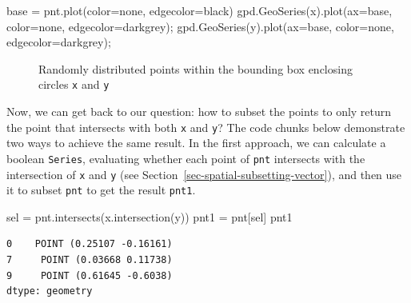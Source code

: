 \documentclass[
  letterpaper,
]{krantz}
\newenvironment{Shaded}{\begin{snugshade}}{\end{snugshade}}
\newcommand{\NormalTok}[1]{\textcolor[rgb]{0.00,0.23,0.31}{#1}}
\newcommand{\OperatorTok}[1]{\textcolor[rgb]{0.37,0.37,0.37}{#1}}
\newcommand{\StringTok}[1]{\textcolor[rgb]{0.13,0.47,0.30}{#1}}
\begin{document}
\begin{Shaded}
\begin{Highlighting}[]
\NormalTok{base }\OperatorTok{=}\NormalTok{ pnt.plot(color}\OperatorTok{=}\StringTok{\textquotesingle{}none\textquotesingle{}}\NormalTok{, edgecolor}\OperatorTok{=}\StringTok{\textquotesingle{}black\textquotesingle{}}\NormalTok{)}
\NormalTok{gpd.GeoSeries(x).plot(ax}\OperatorTok{=}\NormalTok{base, color}\OperatorTok{=}\StringTok{\textquotesingle{}none\textquotesingle{}}\NormalTok{, edgecolor}\OperatorTok{=}\StringTok{\textquotesingle{}darkgrey\textquotesingle{}}\NormalTok{)}\OperatorTok{;}
\NormalTok{gpd.GeoSeries(y).plot(ax}\OperatorTok{=}\NormalTok{base, color}\OperatorTok{=}\StringTok{\textquotesingle{}none\textquotesingle{}}\NormalTok{, edgecolor}\OperatorTok{=}\StringTok{\textquotesingle{}darkgrey\textquotesingle{}}\NormalTok{)}\OperatorTok{;}
\end{Highlighting}
\end{Shaded}

\begin{figure}[H]


\caption{\label{fig-random-points}Randomly distributed points within the
bounding box enclosing circles \texttt{x} and \texttt{y}}

\end{figure}%

Now, we can get back to our question: how to subset the points to only
return the point that intersects with both \texttt{x} and \texttt{y}?
The code chunks below demonstrate two ways to achieve the same result.
In the first approach, we can calculate a boolean \texttt{Series},
evaluating whether each point of \texttt{pnt} intersects with the
intersection of \texttt{x} and \texttt{y} (see
Section~\ref{sec-spatial-subsetting-vector}), and then use it to subset
\texttt{pnt} to get the result \texttt{pnt1}.

\begin{Shaded}
\begin{Highlighting}[]
\NormalTok{sel }\OperatorTok{=}\NormalTok{ pnt.intersects(x.intersection(y))}
\NormalTok{pnt1 }\OperatorTok{=}\NormalTok{ pnt[sel]}
\NormalTok{pnt1}
\end{Highlighting}
\end{Shaded}

\begin{verbatim}
0    POINT (0.25107 -0.16161)
7     POINT (0.03668 0.11738)
9     POINT (0.61645 -0.6038)
dtype: geometry
\end{verbatim}
\end{document}

